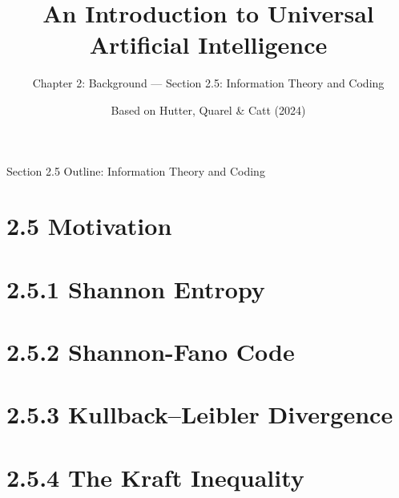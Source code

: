 \documentclass[aspectratio=169,10pt]{beamer}
\title[UAI -- Ch.2.5 Info.\ Theory]{An Introduction to Universal Artificial Intelligence}
\subtitle{Chapter 2: Background --- Section 2.5: Information Theory and Coding}
\author{Based on Hutter, Quarel \& Catt (2024)}
\date{}
\begin{document}
\begin{frame}
  \titlepage
\end{frame}

\begin{frame}{Section 2.5 Outline: Information Theory and Coding}
  \tableofcontents[hideallsubsections]
\end{frame}

\section{2.5 Motivation}
\section{2.5.1 Shannon Entropy}
\section{2.5.2 Shannon-Fano Code}
\section{2.5.3 Kullback--Leibler Divergence}
\section{2.5.4 The Kraft Inequality}
\end{document}
